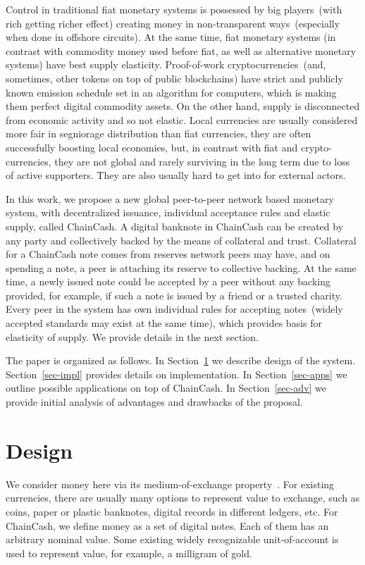 \documentclass{ifcolog}
\newcommand{\cc}{ChainCash}
\begin{document}
Control in traditional fiat monetary systems is possessed by big players~(with rich getting richer effect) creating
money in non-transparent ways~(especially when done in offshore circuits). At the same time,
fiat monetary systems (in contrast with commodity money used before fiat, as well as alternative monetary systems) have
best supply elasticity. Proof-of-work cryptocurrencies~(and, sometimes, other tokens on top of public blockchains) have strict and
publicly known emission schedule set in an algorithm for computers, which is making them perfect digital commodity assets.
On the other hand, supply is disconnected from economic activity and so not elastic. Local currencies are usually considered
more fair in segniorage distribution than fiat currencies, they are often successfully boosting local economies, but,
in contrast with fiat and crypto-currencies, they are not global and rarely surviving in the long term due to loss of active supporters.
They are also usually hard to get into for external actors.

In this work, we propose a new global peer-to-peer network based monetary system, with decentralized issuance, individual acceptance rules and elastic supply, called \cc{}.
A digital banknote in \cc{} can be created by any party and collectively backed by the means of collateral and trust. Collateral for a \cc{} note comes from reserves network peers may have, and on spending a note, a peer is attaching its
reserve to collective backing. At the same time, a newly issued note could be accepted by a peer without any backing provided, for example, if such a note is issued by a friend or a trusted charity. Every peer in the system has own individual rules
for accepting notes~(widely accepted standards may exist at the same time), which provides basis for elasticity of supply. We provide details in the next section.

The paper is organized as follows. In Section~\ref{sec-design} we describe design of the system. Section~\ref{sec-impl} provides
details on implementation. In Section~\ref{sec-apps} we outline possible applications on top of \cc{}. In Section~\ref{sec-adv} we provide initial analysis
of advantages and drawbacks of the proposal.

\section{Design}
\label{sec-design}

We consider money here via its medium-of-exchange property~\cite{kiyotaki1989money}. For existing currencies, there are usually many options to represent value to exchange, such as coins, paper or plastic banknotes, digital records in different ledgers, etc. For \cc{}, we define money as a set of digital notes. Each of them has an arbitrary nominal value. Some existing widely recognizable unit-of-account is used to represent value, for example, a milligram of gold.
\end{document}
